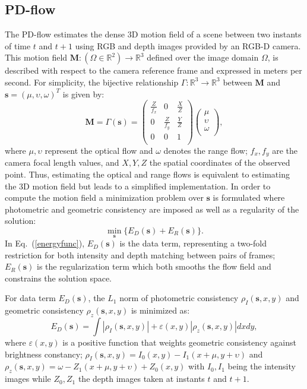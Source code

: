 \documentclass[10pt,twocolumn,letterpaper]{article}
\begin{document}
\subsection{PD-flow}\label{pdflow}

The PD-flow estimates the dense 3D motion field of a scene between 
two instants of time $t$ and $t+1$ using RGB and depth images provided by an 
RGB-D camera. This motion field $\textbf{M}: (\Omega \in \mathbb{R}^{2}) 
\rightarrow \mathbb{R}^{3}$  defined over the image domain $\Omega$, is 
described with respect to the camera reference frame and expressed in meters per 
second. For simplicity, the bijective relationship $\Gamma: \mathbb{R}^{3} 
\rightarrow \mathbb{R}^3$ between $\textbf{M}$ and  $\textbf{s} = 
(\mu,\upsilon,\omega)^{T}$ is given by:
\begin{equation}
\textbf{M} = \Gamma(\textbf{s}) = \begin{pmatrix}
 \frac{Z}{f_{x}} & 0 & \frac{X}{Z} \\     
 0 & \frac{Z}{f_{y}} & \frac{Y}{Z}\\ 
 0 & 0 & 1 \\ 
\end{pmatrix}
\begin{pmatrix}
 \mu\\
\upsilon\\     
\omega\\     
\end{pmatrix},
\end{equation}
where $\mu,\upsilon$ represent the optical flow and $\omega$ denotes the range 
flow; $f_{x}, f_{y}$ are the camera focal length values, and $X,Y,Z$ the 
spatial coordinates of the observed point. Thus, estimating the optical and 
range flows is equivalent to estimating the 3D motion field but leads to a 
simplified implementation. In order to compute the motion field a minimization 
problem over $\textbf{s}$ is formulated where photometric and geometric 
consistency are imposed as well as a regularity of the solution:
\begin{equation}\label{energyfunc}
\min\limits_{\textbf{s}}\{E_{D}(\textbf{s}) + E_{R}(\textbf{s})\}.
\end{equation}
In Eq.~(\ref{energyfunc}), $E_{D}(\textbf{s})$ is the data term, representing a 
two-fold restriction for both intensity and depth matching between pairs of 
frames; $E_{R}(\textbf{s})$ is the regularization term which both smooths the 
flow field and constrains the solution space. 


For data term $E_{D}(\textbf{s})$, the $L_{1}$ norm of photometric consistency 
$\rho_{I}(\textbf{s},x,y)$ 
and geometric consistency $\rho_{z}(\textbf{s},x,y)$ is minimized as:
\begin{equation}
E_{D}(\textbf{s}) = \int|\rho_{I}(\textbf{s},x,y)| + \varepsilon(x,y)|\rho_{z}(\textbf{s},x,y)|dxdy,\label{dt}
\end{equation}
where $\varepsilon(x,y)$ is a positive function that weights geometric consistency against brightness constancy; $\rho_{I}(\textbf{s},x,y) = I_{0}(x,y) - I_{1}(x+\mu,y+\upsilon)$ and $\rho_{z}(\textbf{s},x,y) = \omega - Z_{1}(x+\mu,y+\upsilon) + Z_{0}(x,y)$ with $I_{0}, I_{1}$ being the intensity images while $Z_{0}, Z_{1}$ the depth images taken at instants $t$ and $t+1$.
\end{document}
